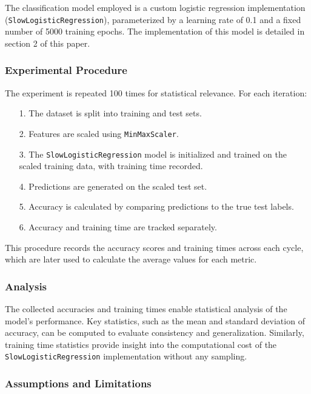 \documentclass{article}
\theoremstyle{plain}
\theoremstyle{definition}
\theoremstyle{remark}
\begin{document}
The classification model employed is a custom logistic regression implementation (\texttt{SlowLogisticRegression}), parameterized by a learning rate of 0.1 and a fixed number of 5000 training epochs. The implementation of this model is detailed in section 2 of this paper.


\subsubsection{Experimental Procedure}

The experiment is repeated 100 times for statistical relevance. For each iteration:

\begin{itemize}
 \item [1.] The dataset is split into training and test sets.
 \item [2.] Features are scaled using \texttt{MinMaxScaler}.
 \item [3.] The \texttt{SlowLogisticRegression} model is initialized and trained on the scaled training data, with training time recorded.
 \item [4.] Predictions are generated on the scaled test set.
 \item [5.] Accuracy is calculated by comparing predictions to the true test labels.
 \item [6.] Accuracy and training time are tracked separately.
\end{itemize}

This procedure records the accuracy scores and training times across each cycle, which are later used to calculate the average values for each metric.


\subsubsection{Analysis}

The collected accuracies and training times enable statistical analysis of the model's performance. Key statistics, such as the mean and standard deviation of accuracy, can be computed to evaluate consistency and generalization. Similarly, training time statistics provide insight into the computational cost of the \texttt{SlowLogisticRegression} implementation without any sampling.


\subsubsection{Assumptions and Limitations}
\end{document}
